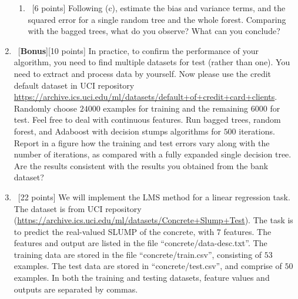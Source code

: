 \documentclass[12pt, fullpage,letterpaper]{article}
\begin{document}
\begin{enumerate}
\begin{enumerate}
	\item~[6 points] Following (c), estimate the bias and variance terms, and the squared error for a single random tree and the whole forest.  Comparing with the bagged trees, what do you observe? What can you conclude? 
\end{enumerate}

\item~[\textbf{Bonus}][10 points] In practice, to confirm the performance of your algorithm, you need to find multiple datasets for test (rather than one). You need to extract and process data by yourself. Now please use the credit default dataset in UCI repository \href{https://archive.ics.uci.edu/ml/datasets/default+of+credit+card+clients}{https://archive.ics.uci.edu/ml/datasets/default+of+credit+card+clients}. Randomly choose $24000$ examples for training and the remaining $6000$ for test. Feel free to deal with continuous features. Run bagged trees, random forest, and Adaboost with decision stumps algorithms for $500$ iterations. Report in a figure how the training and test errors vary along with the number of iterations, as compared with a fully expanded single decision tree. Are the results consistent with the results you obtained from the bank dataset?

	\item~[22 points] We will implement the LMS method for a linear regression task. The dataset is from UCI repository (\url{https://archive.ics.uci.edu/ml/datasets/Concrete+Slump+Test}). The task is to predict the real-valued SLUMP of the concrete, with $7$ features. The features and output are listed in the file ``concrete/data-desc.txt''. The training data are stored in the file ``concrete/train.csv'', consisting of $53$ examples. The test data are stored in ``concrete/test.csv'', and comprise of $50$ examples. In both the training and testing datasets, feature values and outputs are separated by commas. 
	

\end{enumerate}
\end{document}
